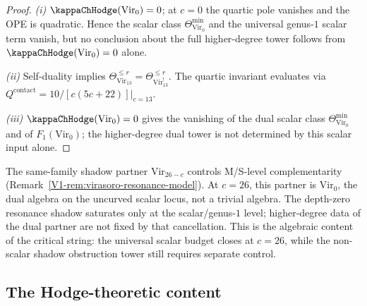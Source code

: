 \begin{proof}
\emph{(i)} $\kappaChHodge(\mathrm{Vir}_0) = 0$; at $c = 0$ the quartic pole
vanishes and the OPE is quadratic. Hence the scalar class
$\Theta_{\mathrm{Vir}_0}^{\min}$ and the universal genus-$1$ scalar
term vanish, but no conclusion about the full higher-degree tower
follows from $\kappaChHodge(\mathrm{Vir}_0)=0$ alone.

\emph{(ii)} Self-duality implies $\Theta_{\mathrm{Vir}_{13}}^{\leq r}
= \Theta_{\mathrm{Vir}_{13}^!}^{\leq r}$. The quartic invariant
evaluates via $Q^{\mathrm{contact}} = 10/[c(5c+22)]|_{c=13}$.

\emph{(iii)} $\kappaChHodge(\mathrm{Vir}_0) = 0$ gives the vanishing of the
dual scalar class $\Theta_{\mathrm{Vir}_0}^{\min}$ and of
$F_1(\mathrm{Vir}_0)$; the higher-degree dual tower is not determined
by this scalar input alone.
\end{proof}

\begin{remark}
The same-family shadow partner $\mathrm{Vir}_{26-c}$ controls
M/S-level complementarity
(Remark~\ref{V1-rem:virasoro-resonance-model}). At $c = 26$, this
partner is $\mathrm{Vir}_0$, the dual algebra on the uncurved scalar
locus, not a trivial algebra. The depth-zero resonance shadow
saturates only at the scalar/genus-$1$ level; higher-degree data of the
dual partner are not fixed by that cancellation. This is the
algebraic content of the critical string: the universal scalar budget
closes at $c = 26$, while the non-scalar shadow obstruction tower still requires
separate control.
\end{remark}

%
%

\subsection{The Hodge-theoretic content}

